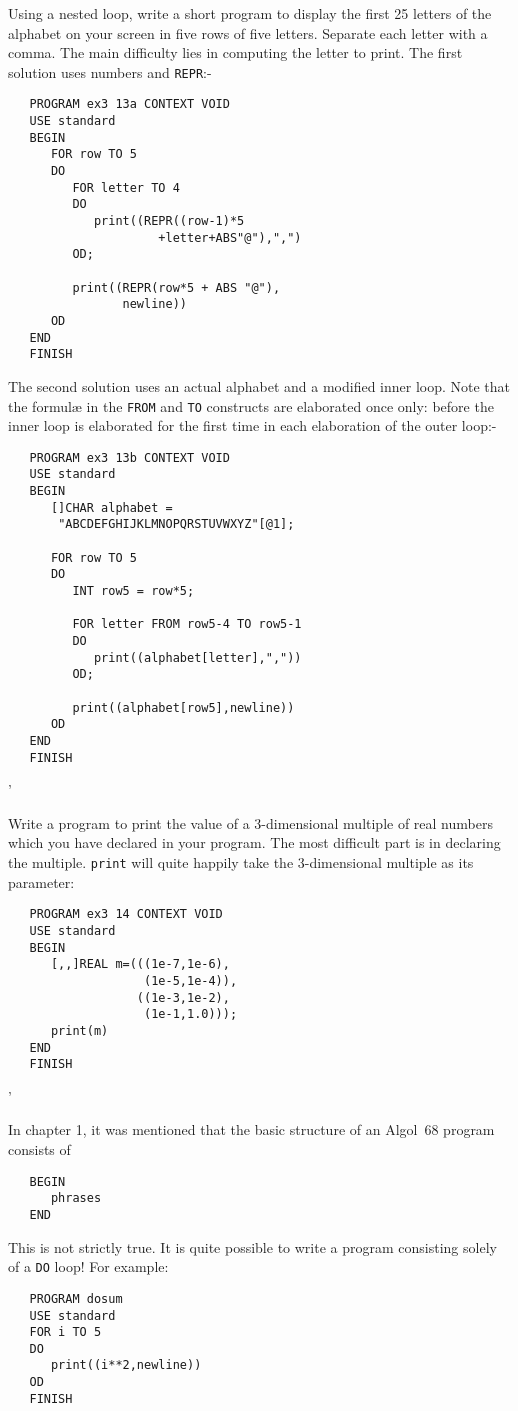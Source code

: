 \begin{exercise}
\item Using a nested loop, write a short program to display the first
25 letters of the alphabet on your screen in five rows of five
letters.  Separate each letter with a comma.
\ans The main difficulty lies in computing the letter to print. The
first solution uses numbers and \verb|REPR|:-
\begin{verbatim}
   PROGRAM ex3 13a CONTEXT VOID
   USE standard
   BEGIN
      FOR row TO 5
      DO
         FOR letter TO 4
         DO
            print((REPR((row-1)*5
                     +letter+ABS"@"),",")
         OD;

         print((REPR(row*5 + ABS "@"),
                newline))
      OD
   END
   FINISH
\end{verbatim}
\noindent
The second solution uses an actual alphabet and a modified inner
loop. Note that the formul\ae{} in the \verb|FROM| and \verb|TO|
constructs are elaborated once only: before the inner loop is
elaborated for the first time in each elaboration of the outer loop:-
\begin{verbatim}
   PROGRAM ex3 13b CONTEXT VOID
   USE standard
   BEGIN
      []CHAR alphabet =
       "ABCDEFGHIJKLMNOPQRSTUVWXYZ"[@1];

      FOR row TO 5
      DO
         INT row5 = row*5;

         FOR letter FROM row5-4 TO row5-1
         DO
            print((alphabet[letter],","))
         OD;

         print((alphabet[row5],newline))
      OD
   END
   FINISH
\end{verbatim}
'
\item Write a program to print the value of a 3-dimensional multiple
of real numbers which you have declared in your program.
\ans The most difficult part is in declaring the multiple.
\verb|print| will quite happily take the 3-dimensional multiple as
its parameter:
\begin{verbatim}
   PROGRAM ex3 14 CONTEXT VOID
   USE standard
   BEGIN
      [,,]REAL m=(((1e-7,1e-6),
                   (1e-5,1e-4)),
                  ((1e-3,1e-2),
                   (1e-1,1.0)));
      print(m)
   END
   FINISH
\end{verbatim}
'
\end{exercise}

In chapter 1, it was mentioned that the basic structure of an
Algol~68 program consists of
\begin{verbatim}
   BEGIN
      phrases
   END
\end{verbatim}
\noindent
This is not strictly true. It is quite possible to write a program
consisting solely of a \verb|DO| loop! For example:
\begin{verbatim}
   PROGRAM dosum
   USE standard
   FOR i TO 5
   DO
      print((i**2,newline))
   OD
   FINISH
\end{verbatim}

